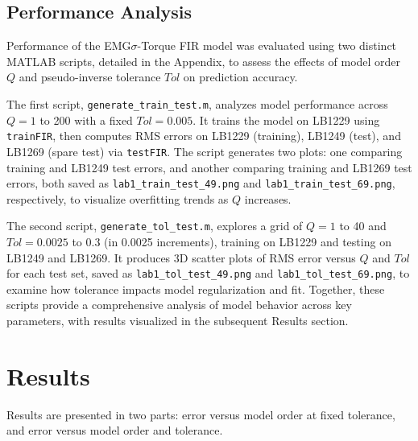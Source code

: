 \documentclass[12pt]{article}
\begin{document}
\subsection*{Performance Analysis}
Performance of the EMG$\sigma$-Torque FIR model was evaluated using two distinct MATLAB scripts, detailed in the Appendix, to assess the effects of model order $Q$ and pseudo-inverse tolerance $Tol$ on prediction accuracy. 

The first script, \texttt{generate\_train\_test.m}, analyzes model performance across $Q = 1$ to 200 with a fixed $Tol = 0.005$. It trains the model on LB1229 using \texttt{trainFIR}, then computes RMS errors on LB1229 (training), LB1249 (test), and LB1269 (spare test) via \texttt{testFIR}. The script generates two plots: one comparing training and LB1249 test errors, and another comparing training and LB1269 test errors, both saved as \texttt{lab1\_train\_test\_49.png} and \texttt{lab1\_train\_test\_69.png}, respectively, to visualize overfitting trends as $Q$ increases. 

The second script, \texttt{generate\_tol\_test.m}, explores a grid of $Q = 1$ to 40 and $Tol = 0.0025$ to 0.3 (in 0.0025 increments), training on LB1229 and testing on LB1249 and LB1269. It produces 3D scatter plots of RMS error versus $Q$ and $Tol$ for each test set, saved as \texttt{lab1\_tol\_test\_49.png} and \texttt{lab1\_tol\_test\_69.png}, to examine how tolerance impacts model regularization and fit. Together, these scripts provide a comprehensive analysis of model behavior across key parameters, with results visualized in the subsequent Results section.

\newpage
\section*{Results}
Results are presented in two parts: error versus model order at fixed tolerance, and error versus model order and tolerance.
\end{document}
